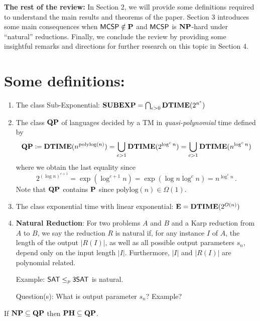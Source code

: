 \documentclass[12pt]{article}
\theoremstyle{definition}
\begin{document}
\textbf{The rest of the review:} In Section 2, we will provide some definitions required to understand the main results and theorems of the paper. Section 3 introduces some main consequences when $\mathprob{MCSP} \notin \P$ and $\mathprob{MCSP}$ is $\NP$-hard under ``natural'' reductions. Finally, we conclude the review by providing some insightful remarks and directions for further research on this topic in Section 4.

\bigskip
\section{Some definitions:}
\begin{enumerate} [1.]
	\item The class Sub-Exponential: $\class{SUBEXP} = \bigcap_{\epsilon > 0} \TIME(2^{n^{\epsilon}})$
  \item The class $\class{QP}$ of languages decided by a TM in
    \emph{quasi-polynomial} time defined by
    \[
      \class{QP}
      \coloneqq
      \TIME(n^{\mathrm{polylog}(n)})
      =
      \bigcup_{c > 1}\TIME(2^{\log^c n})
      =
      \bigcup_{c > 1}\TIME(n^{\log^c n})
    \]
    where we obtain the last equality since
    \[
      2^{(\log n)^{c+1}} = \exp( \log^{c+1} n ) = \exp( \log n \log^c n )
      = n^{\log^c n} \,.
    \]
    Note that $\class{QP}$ contains $\P$ since $\mathrm{polylog}(n) \in \Omega(1)$.
	\item The class exponential time with linear exponential: $\class{E} = \TIME(2^{O(n)})$
	
	\item \textbf{Natural Reduction}: For two problems $A$ and $B$ and a Karp reduction from $A$ to $B$, we say the reduction $R$ is natural if, for any instance $I$ of $A$, the length of the output $|R(I)|$, as well as all possible output parameters $s_n$, depend only on the input length $|I|$. Furthermore, $|I|$ and $|R(I)|$ are polynomial related.
	
	Example: $\mathprob{SAT} \leq_p \mathprob{3SAT}$ is natural. 
	
	Question(s): What is output parameter $s_n$? Example?
\end{enumerate}

\newpage

\begin{lemma}
  If $\NP \subseteq \class{QP}$ then
  $\class{PH} \subseteq \class{QP}$.
\end{lemma}
\end{document}
